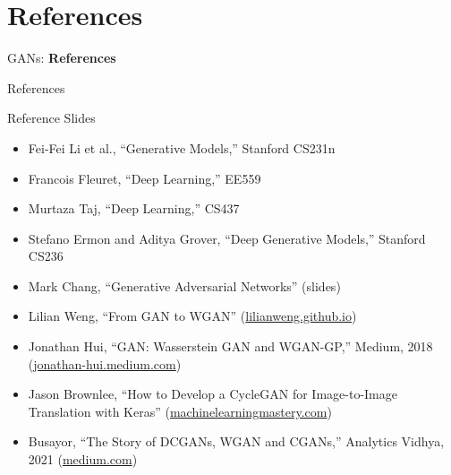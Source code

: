\section{References}
\begin{frame}{}
    \LARGE GANs: \textbf{References}
\end{frame}

\begin{frame}{References}

Reference Slides
\begin{itemize}
    \item Fei-Fei Li et al., ``Generative Models,'' Stanford CS231n
    \item Francois Fleuret, ``Deep Learning,'' EE559
    \item Murtaza Taj, ``Deep Learning,'' CS437
    \item Stefano Ermon and Aditya Grover, ``Deep Generative Models,'' Stanford CS236
    \item Mark Chang, ``Generative Adversarial Networks'' (slides)
    \item Lilian Weng, ``From GAN to WGAN'' (\href{https://lilianweng.github.io/posts/2017-08-20-gan/}{lilianweng.github.io})
    \item Jonathan Hui, ``GAN: Wasserstein GAN and WGAN-GP,'' Medium, 2018 (\href{https://jonathan-hui.medium.com/gan-wasserstein-gan-wgan-gp-6a1a2aa1b490}{jonathan-hui.medium.com})
    \item Jason Brownlee, ``How to Develop a CycleGAN for Image-to-Image Translation with Keras'' (\href{https://machinelearningmastery.com/cyclegan-tutorial-with-keras/}{machinelearningmastery.com})
    \item Busayor, ``The Story of DCGANs, WGAN and CGANs,'' Analytics Vidhya, 2021 (\href{https://medium.com/analytics-vidhya/the-story-of-dcgans-wgan-and-cgans-c0182ad014bd}{medium.com})
\end{itemize}
    
\end{frame}


